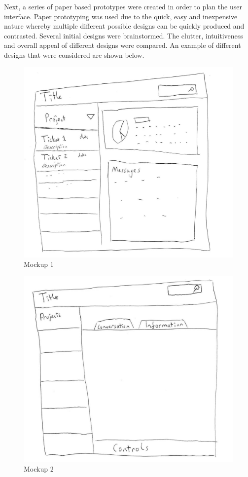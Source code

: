 \documentclass[a4paper]{l3proj}
\begin{document}
Next, a series of paper based prototypes were created in order to plan the user interface. Paper prototyping was used due to the quick, easy and inexpensive nature whereby multiple different possible designs can be quickly produced and contrasted. Several initial designs were brainstormed. The clutter, intuitiveness and overall appeal of different designs were compared.  An example of different designs that were considered are shown below. 

\begin{figure}
\includegraphics[scale=0.2]{mockup1}
\caption{Mockup 1}
\end{figure}

\begin{figure}
\includegraphics[scale=0.2]{mockup2}
\caption{Mockup 2}
\end{figure}
\end{document}

